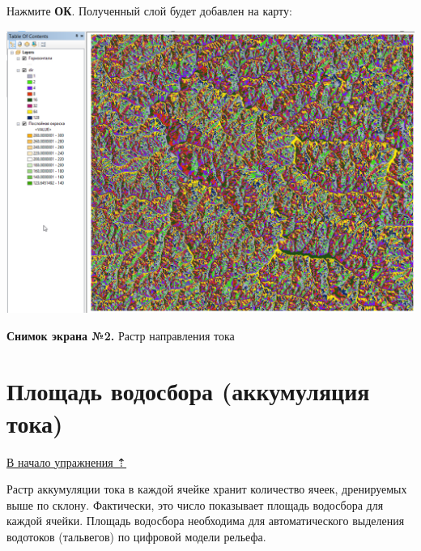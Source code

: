 \documentclass[]{book}
\theoremstyle{definition}
\theoremstyle{definition}
\theoremstyle{definition}
\theoremstyle{remark}
\begin{document}
Нажмите \textbf{ОК}. Полученный слой будет добавлен на карту:

\includegraphics{images/Ex15/image11.png}

\textbf{Снимок экрана №2.} Растр направления тока

\hypertarget{dem-flowacc}{%
\section{Площадь водосбора (аккумуляция тока)}\label{dem-flowacc}}

\protect\hyperlink{dem}{В начало упражнения ⇡}

Растр аккумуляции тока в каждой ячейке хранит количество ячеек,
дренируемых выше по склону. Фактически, это число показывает площадь
водосбора для каждой ячейки. Площадь водосбора необходима для
автоматического выделения водотоков (тальвегов) по цифровой модели
рельефа.
\end{document}
